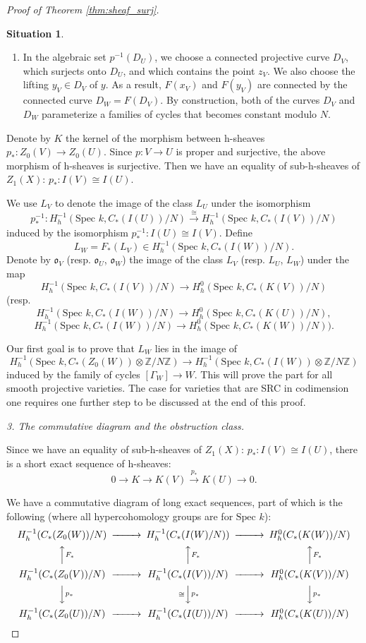 \documentclass{amsart}
\theoremstyle{definition}
\newtheorem{sit}[theorem]{Situation}
\theoremstyle{remark}
\newcommand{\mbb}{\mathbb}
\newcommand{\ZZ}{\mbb{Z}}
\newcommand{\SP}{\text{Spec }}
\begin{document}
\begin{proof}[Proof of Theorem \ref{thm:sheaf_surj}]
\begin{sit}
\begin{enumerate}
    \item[(iii)]  In the algebraic set $p^{-1}(D_U)$, we choose a connected projective curve $D_V$, which surjects onto $D_U$, and which contains the point $z_V$.
    We also choose the lifting $y_V \in D_V$ of $y$. 
    As a result, $F(x_V)$ and $F(y_V)$ are connected by the connected curve $D_W=F(D_V)$.
    By construction, both of the curves $D_V$ and $D_W$ parameterize a families of cycles that becomes constant modulo $N$. 
\end{enumerate}
\end{sit}

    

    Denote by $K$ the kernel of the morphism between h-sheaves 
$p_*: Z_0(V) \to Z_0(U)$.
Since $p: V \to U$ is proper and surjective, the above morphism of h-sheaves is surjective. 
Then we have an equality of sub-h-sheaves of $Z_1(X)$:
$p_*: I(V) \cong I(U)$.

    We use $L_V$ to denote the image of the class $L_U$ under the isomorphism $$p^{-1}_*:H^{-1}_h(\SP k, C_*(I(U))/N) \xrightarrow{\cong} H^{-1}_h(\SP k, C_*(I(V))/N)$$ induced by the isomorphism $p^{-1}_*:I(U)\cong I(V)$.
Define $$L_W=F_*(L_V) \in H^{-1}_h(\SP k, C_*(I(W))/N).$$
Denote by $\mathfrak{o}_V$ (resp. $\mathfrak{o}_U$, $\mathfrak{o}_W$) the image of the class $L_V$ (resp. $L_U$, $L_W$) under the map $$H^{-1}_h(\SP k, C_*(I(V))/N) \to H^0_h(\SP k, C_*(K(V))/N)$$ (resp. $$H^{-1}_h(\SP k, C_*(I(W))/N) \to H^0_h(\SP k, C_*(K(U))/N),$$
$$H^{-1}_h(\SP k, C_*(I(W))/N) \to H^0_h(\SP k, C_*(K(W))/N)).$$

Our first goal is to prove that $L_W$ lies in the image of 
\[
H_h^{-1}(\SP k, C_*(Z_0(W))\otimes \ZZ/N \ZZ) \to H_h^{-1}(\SP k, C_* (I(W)) \otimes \ZZ/N \ZZ)
\]
induced by the family of cycles $[\Gamma_W]\to W$.
This will prove the part for all smooth projective varieties. 
The case for varieties that are SRC in codimension one requires one further step to be discussed at the end of this proof.

\textit{3. The commutative diagram and the obstruction class.}

Since we have an equality of sub-h-sheaves of $Z_1(X)$:
$p_*: I(V) \cong I(U)$,
there is a short exact sequence of h-sheaves:
\[
0 \to K \to K(V) \xrightarrow{p_*} K(U) \to 0.
\]


We have a commutative diagram of long exact sequences, part of which is the following (where all hypercohomology groups are for $\SP k$):
\[
\begin{CD}
H^{-1}_h( C_*(Z_0(W))/N) @>>> H^{-1}_h( C_*(I(W) /N)) @>>> H^{0}_h( C_*(K(W))/N)\\
@AA F_*A @AAF_*A @AA F_* A\\
H^{-1}_h( C_*(Z_0(V))/N) @>>> H^{-1}_h( C_*(I(V))/N) @>>> H^{0}_h( C_*(K(V))/N) \\
@VV p_* V @V\cong Vp_*V @VV p_* V\\
H^{-1}_h(C_*(Z_0(U))/N) @>>> H^{-1}_h(C_*(I(U))/N) @>>> H^{0}_h(C_*(K(U))/N)\\
\end{CD}
\]





\end{proof}
\end{document}
